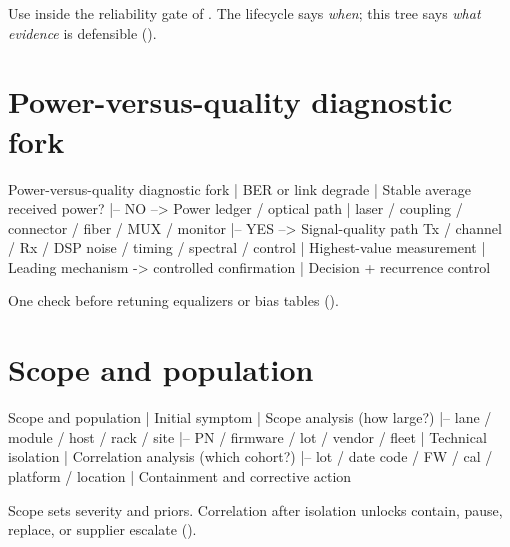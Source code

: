 Use inside the reliability gate of . The lifecycle
says \emph{when}; this tree says \emph{what evidence} is defensible
().


\section{Power-versus-quality diagnostic fork}
\label{sec:tree-power-fork}

\begin{dectree}
Power-versus-quality diagnostic fork
  |
BER or link degrade
  |
Stable average received power?
  |-- NO  --> Power ledger / optical path
  |           laser / coupling / connector / fiber / MUX / monitor
  |-- YES --> Signal-quality path
              Tx / channel / Rx / DSP
              noise / timing / spectral / control
  |
Highest-value measurement
  |
Leading mechanism -> controlled confirmation
  |
Decision + recurrence control
\end{dectree}

One check before retuning equalizers or bias tables
().


\section{Scope and population}
\label{sec:tree-scope-population}

\begin{dectree}
Scope and population
  |
Initial symptom
  |
Scope analysis (how large?)
  |-- lane / module / host / rack / site
  |-- PN / firmware / lot / vendor / fleet
  |
Technical isolation
  |
Correlation analysis (which cohort?)
  |-- lot / date code / FW / cal / platform / location
  |
Containment and corrective action
\end{dectree}

Scope sets severity and priors. Correlation after isolation unlocks contain,
pause, replace, or supplier escalate ().


